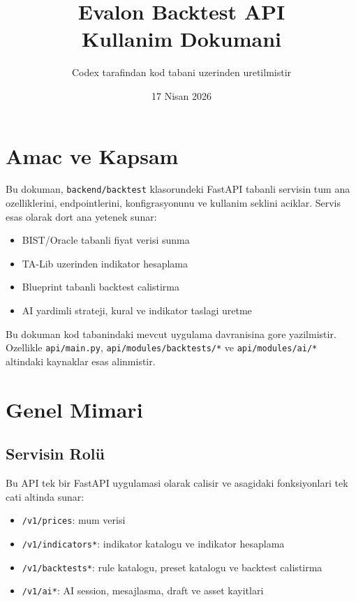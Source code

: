 \documentclass[11pt,a4paper]{article}
\title{Evalon Backtest API\\Kullanim Dokumani}
\author{Codex tarafindan kod tabani uzerinden uretilmistir}
\date{17 Nisan 2026}
\begin{document}
\maketitle
\tableofcontents
\newpage

\section{Amac ve Kapsam}

Bu dokuman, \texttt{backend/backtest} klasorundeki FastAPI tabanli servisin tum ana ozelliklerini, endpointlerini, konfigrasyonunu ve kullanim seklini aciklar. Servis esas olarak dort ana yetenek sunar:

\begin{itemize}[leftmargin=1.5em]
    \item BIST/Oracle tabanli fiyat verisi sunma
    \item TA-Lib uzerinden indikator hesaplama
    \item Blueprint tabanli backtest calistirma
    \item AI yardimli strateji, kural ve indikator taslagi uretme
\end{itemize}

Bu dokuman kod tabanindaki mevcut uygulama davranisina gore yazilmistir. Ozellikle \texttt{api/main.py}, \texttt{api/modules/backtests/*} ve \texttt{api/modules/ai/*} altindaki kaynaklar esas alinmistir.

\section{Genel Mimari}

\subsection{Servisin Rolü}

Bu API tek bir FastAPI uygulamasi olarak calisir ve asagidaki fonksiyonlari tek cati altinda sunar:

\begin{itemize}[leftmargin=1.5em]
    \item \texttt{/v1/prices}: mum verisi
    \item \texttt{/v1/indicators*}: indikator katalogu ve indikator hesaplama
    \item \texttt{/v1/backtests*}: rule katalogu, preset katalogu ve backtest calistirma
    \item \texttt{/v1/ai*}: AI session, mesajlasma, draft ve asset kayitlari
\end{itemize}
\end{document}

